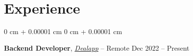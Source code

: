 \documentclass[10pt, letterpaper]{article}
\newenvironment{highlightsforbulletentries}{
    \begin{itemize}[
        topsep=0.10 cm,
        parsep=0.10 cm,
        partopsep=0pt,
        itemsep=0pt,
        leftmargin=10pt
    ]
}{
    \end{itemize}
} %
\newenvironment{onecolentry}{
    \begin{adjustwidth}{
        0 cm + 0.00001 cm
    }{
        0 cm + 0.00001 cm
    }
}{
    \end{adjustwidth}
} %
\newenvironment{twocolentry}[2][]{
    \onecolentry
    \def\secondColumn{#2}
    \setcolumnwidth{\fill, 4.5 cm}
    \begin{paracol}{2}
}{
    \switchcolumn \raggedleft \secondColumn
    \end{paracol}
    \endonecolentry
} %
\begin{document}
    










            

    \section{Experience}
        \begin{twocolentry}{
            Dec 2022 – Present
        }
            \textbf{Backend Developer}, \href{https://dealapp.sa/tabs/home}{\textit{Dealapp}} -- Remote\end{twocolentry}
\end{document}
